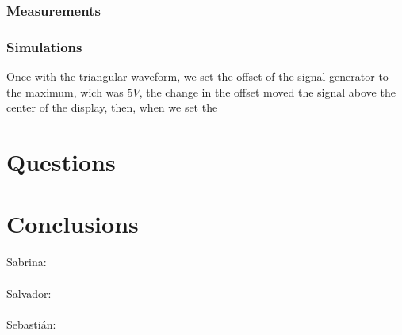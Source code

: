 \documentclass[a4paper]{article}
\begin{document}
\subsubsection{Measurements}
\subsubsection{Simulations}
Once with the triangular waveform, we set the offset of the signal generator to the maximum, wich
was $5 V$, the change in the offset moved the signal above the center of the display, then, when
we set the 

\section{Questions}
\section{Conclusions}
{\large Sabrina:}\\
\\[2ex]
{\large Salvador:}\\
\\[2ex]
{\large Sebastián:}\\
\end{document}
